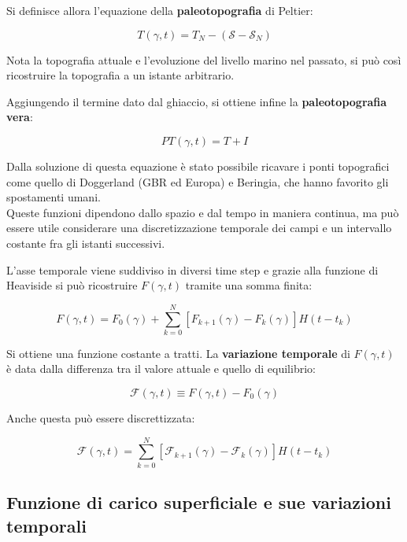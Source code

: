 \documentclass[a4paper,12pt]{book}
\begin{document}
\noindent Si definisce allora l'equazione della \textbf{paleotopografia} di Peltier:

\begin{equation}
    T(\gamma, t) = T_N - (\mathcal{S} - \mathcal{S}_N)
\end{equation}

\noindent
Nota la topografia attuale e l’evoluzione del livello marino nel passato, si può così ricostruire la topografia a un istante arbitrario.

Aggiungendo il termine dato dal ghiaccio, si ottiene infine la \textbf{paleotopografia vera}:

\begin{equation}
    PT(\gamma,t) = T + I
\end{equation}

\noindent
Dalla soluzione di questa equazione è stato possibile ricavare i ponti topografici come quello di Doggerland (GBR ed Europa) e Beringia, che hanno favorito gli spostamenti umani.\\

\noindent
Queste funzioni dipendono dallo spazio e dal tempo in maniera continua, ma può essere utile considerare una discretizzazione temporale dei campi e un intervallo costante fra gli istanti successivi.

L’asse temporale viene suddiviso in diversi time step e grazie alla funzione di Heaviside si può ricostruire $F(\gamma , t)$ tramite una somma finita:

\begin{equation}
    F(\gamma, t) = F_0 (\gamma) + \sum_{k=0}^N [F_{k+1}(\gamma) - F_k (\gamma) ] H(t-t_k)
\end{equation}

\noindent
Si ottiene una funzione costante a tratti.
La \textbf{variazione temporale} di $F(\gamma,t)$ è data dalla differenza tra il valore attuale e quello di equilibrio:

\begin{equation}
    \mathcal{F}(\gamma, t) \equiv F(\gamma, t) - F_0 (\gamma)
\end{equation}

\noindent
Anche questa può essere discrettizzata:

\begin{equation}
    \mathcal{F}(\gamma, t) = \sum_{k=0}^N [\mathcal{F}_{k+1}(\gamma) - \mathcal{F}_k (\gamma)] H(t-t_k)
\end{equation}

\subsection{\textcolor{colore7}{Funzione di carico superficiale e sue variazioni temporali}}
\end{document}
